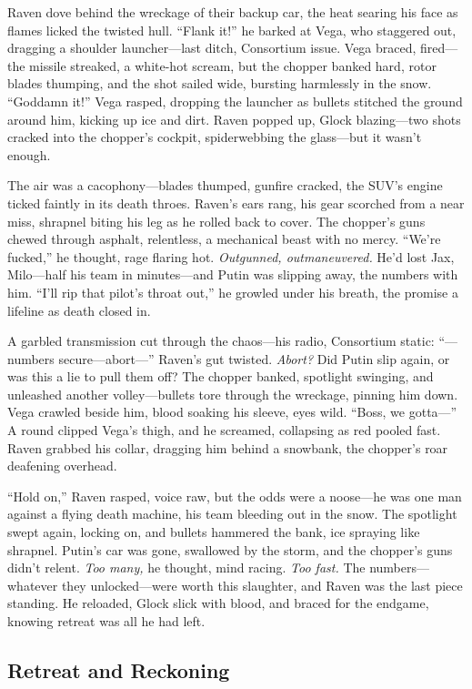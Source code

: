 \documentclass[12pt]{book}
\begin{document}
Raven dove behind the wreckage of their backup car, the heat searing his face as flames licked the twisted hull. “Flank it!” he barked at Vega, who staggered out, dragging a shoulder launcher—last ditch, Consortium issue. Vega braced, fired—the missile streaked, a white-hot scream, but the chopper banked hard, rotor blades thumping, and the shot sailed wide, bursting harmlessly in the snow. “Goddamn it!” Vega rasped, dropping the launcher as bullets stitched the ground around him, kicking up ice and dirt. Raven popped up, Glock blazing—two shots cracked into the chopper’s cockpit, spiderwebbing the glass—but it wasn’t enough.

The air was a cacophony—blades thumped, gunfire cracked, the SUV’s engine ticked faintly in its death throes. Raven’s ears rang, his gear scorched from a near miss, shrapnel biting his leg as he rolled back to cover. The chopper’s guns chewed through asphalt, relentless, a mechanical beast with no mercy. “We’re fucked,” he thought, rage flaring hot. \textit{Outgunned, outmaneuvered.} He’d lost Jax, Milo—half his team in minutes—and Putin was slipping away, the numbers with him. “I’ll rip that pilot’s throat out,” he growled under his breath, the promise a lifeline as death closed in.

A garbled transmission cut through the chaos—his radio, Consortium static: “—numbers secure—abort—” Raven’s gut twisted. \textit{Abort?} Did Putin slip again, or was this a lie to pull them off? The chopper banked, spotlight swinging, and unleashed another volley—bullets tore through the wreckage, pinning him down. Vega crawled beside him, blood soaking his sleeve, eyes wild. “Boss, we gotta—” A round clipped Vega’s thigh, and he screamed, collapsing as red pooled fast. Raven grabbed his collar, dragging him behind a snowbank, the chopper’s roar deafening overhead.

“Hold on,” Raven rasped, voice raw, but the odds were a noose—he was one man against a flying death machine, his team bleeding out in the snow. The spotlight swept again, locking on, and bullets hammered the bank, ice spraying like shrapnel. Putin’s car was gone, swallowed by the storm, and the chopper’s guns didn’t relent. \textit{Too many,} he thought, mind racing. \textit{Too fast.} The numbers—whatever they unlocked—were worth this slaughter, and Raven was the last piece standing. He reloaded, Glock slick with blood, and braced for the endgame, knowing retreat was all he had left.

\subsection{Retreat and Reckoning}
\end{document}
